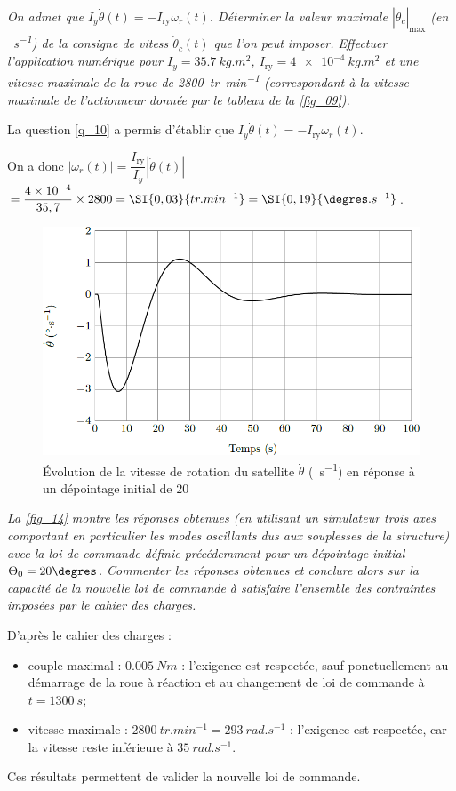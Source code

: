 \question{\label{q_29}}\textit{On admet que $I_y \dot{\theta}(t)=-I_{\text{ry}}\omega_r(t)$. Déterminer la valeur maximale
$|\dot{\theta}_c|_{\text{max}}$ (en \si{\degres.s^{-1}}) 
de la consigne de vitess $\dot{\theta}_c(t)$ que l’on peut imposer. Effectuer l’application numérique pour $I_y = \SI{35,7}{kg.m^2}$, $I_{\text{ry}}=\SI{4e-4}{kg.m^2}$ et une vitesse maximale de la roue de \SI{2800}{tr.min^{-1}} (correspondant à la vitesse maximale
de l’actionneur donnée par le tableau de la \autoref{fig_09}).}
\ifprof
\begin{corrige}
La question \ref{q_10} a permis d'établir que $I_y \dot{\theta}(t)=-I_{\text{ry}}\omega_r(t)$.

On a donc $\left| \omega_r(t) \right| = \dfrac{I_{\text{ry}}}{I_y}\left|\dot{\theta}(t)\right|$ 
$=\dfrac{4\times 10^{-4}}{35,7} \times 2800 =\SI{0,03}{tr.min^{-1}}=\SI{0,19}{\degres.s^{-1}} $.
\end{corrige}
\else
\fi

\ifprof
\else

\begin{figure}[H]
\centering
\includegraphics[width=.7\linewidth]{images/fig_13}
\caption{Évolution de la vitesse de rotation du satellite $\dot{\theta}$ (\si{\degres.s^{-1}}) en réponse à un dépointage initial de 20\degres \label{fig_13}}
\end{figure}
\fi


\question{\label{q_30}}\textit{La \autoref{fig_14} montre les réponses obtenues (en utilisant un simulateur trois axes comportant en particulier les modes oscillants dus aux souplesses de la structure) avec la loi de commande définie précédemment pour un dépointage initial $\Theta_0 = 20\degres$. Commenter les réponses obtenues et conclure alors sur la capacité de la nouvelle loi de commande à satisfaire l’ensemble des contraintes imposées par le cahier des charges.}
\ifprof
\begin{corrige}
D'après le cahier des charges : 
\begin{itemize}
\item couple maximal : $\SI{0,005}{Nm}$ : l'exigence est respectée, sauf ponctuellement au démarrage de la roue à réaction et au changement de loi de commande à $t=\SI{1300}{s}$;
\item vitesse maximale : $\SI{2800}{tr.min^{-1}} = \SI{293}{rad.s^{-1}}$ : l'exigence est respectée, car la vitesse reste inférieure à $\SI{35}{rad.s^{-1}}$.
\end{itemize}
Ces résultats permettent de valider la nouvelle loi de commande.
\end{corrige}
\else
\fi

